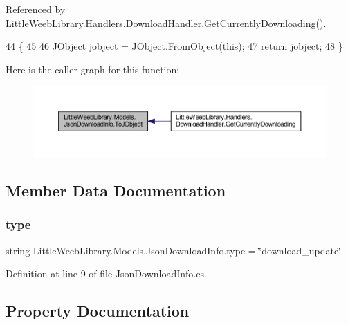 Referenced by Little\+Weeb\+Library.\+Handlers.\+Download\+Handler.\+Get\+Currently\+Downloading().


\begin{DoxyCode}
44         \{
45 
46             JObject jobject = JObject.FromObject(\textcolor{keyword}{this});
47             \textcolor{keywordflow}{return} jobject;
48         \}
\end{DoxyCode}
Here is the caller graph for this function\+:\nopagebreak
\begin{figure}[H]
\begin{center}
\leavevmode
\includegraphics[width=350pt]{class_little_weeb_library_1_1_models_1_1_json_download_info_a9a8921b52b118be5bc135ad49a4aee29_icgraph}
\end{center}
\end{figure}


\subsection{Member Data Documentation}
\mbox{\label{class_little_weeb_library_1_1_models_1_1_json_download_info_a4c31eb2a79dc5e0d239b493c3e8dd866}} 
\subsubsection{\texorpdfstring{type}{type}}
{\footnotesize\ttfamily string Little\+Weeb\+Library.\+Models.\+Json\+Download\+Info.\+type = \char`\"{}download\+\_\+update\char`\"{}}



Definition at line 9 of file Json\+Download\+Info.\+cs.



\subsection{Property Documentation}
\mbox{\label{class_little_weeb_library_1_1_models_1_1_json_download_info_a544452b6bde1433070fb088af297cc12}} 
